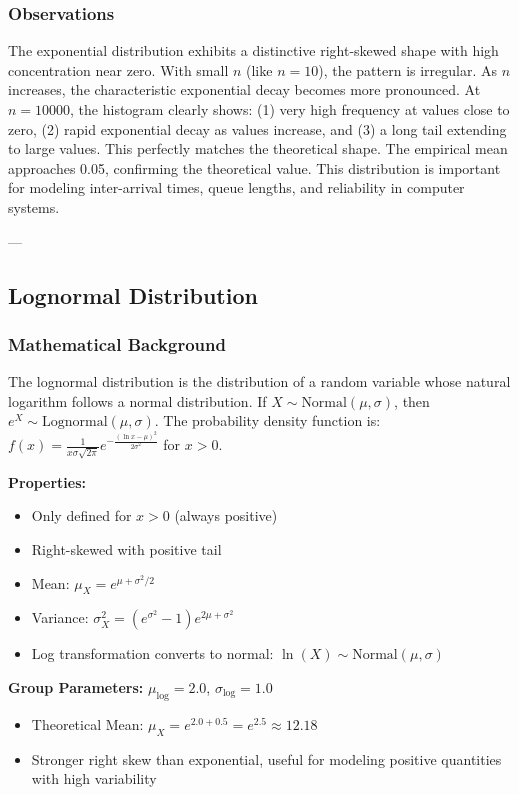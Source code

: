 \documentclass[12pt]{article}
\begin{document}
\subsubsection{Observations}

The exponential distribution exhibits a distinctive right-skewed shape with high concentration near zero. With small $n$ (like $n=10$), the pattern is irregular. As $n$ increases, the characteristic exponential decay becomes more pronounced. At $n=10000$, the histogram clearly shows: (1) very high frequency at values close to zero, (2) rapid exponential decay as values increase, and (3) a long tail extending to large values. This perfectly matches the theoretical shape. The empirical mean approaches 0.05, confirming the theoretical value. This distribution is important for modeling inter-arrival times, queue lengths, and reliability in computer systems.

---

\subsection{Lognormal Distribution}

\subsubsection{Mathematical Background}

The lognormal distribution is the distribution of a random variable whose natural logarithm follows a normal distribution. If $X \sim \text{Normal}(\mu, \sigma)$, then $e^X \sim \text{Lognormal}(\mu, \sigma)$. The probability density function is: $f(x) = \frac{1}{x\sigma\sqrt{2\pi}} e^{-\frac{(\ln x - \mu)^2}{2\sigma^2}}$ for $x > 0$.

\textbf{Properties:}
\begin{itemize}
    \item Only defined for $x > 0$ (always positive)
    \item Right-skewed with positive tail
    \item Mean: $\mu_X = e^{\mu + \sigma^2/2}$
    \item Variance: $\sigma_X^2 = (e^{\sigma^2} - 1) e^{2\mu + \sigma^2}$
    \item Log transformation converts to normal: $\ln(X) \sim \text{Normal}(\mu, \sigma)$
\end{itemize}

\textbf{Group Parameters:} $\mu_{\text{log}} = 2.0$, $\sigma_{\text{log}} = 1.0$
\begin{itemize}
    \item Theoretical Mean: $\mu_X = e^{2.0 + 0.5} = e^{2.5} \approx 12.18$
    \item Stronger right skew than exponential, useful for modeling positive quantities with high variability
\end{itemize}
\end{document}
